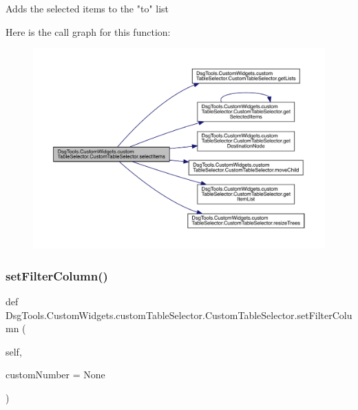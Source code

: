 \begin{DoxyVerb}Adds the selected items to the "to" list
\end{DoxyVerb}
 Here is the call graph for this function\+:
\nopagebreak
\begin{figure}[H]
\begin{center}
\leavevmode
\includegraphics[width=350pt]{class_dsg_tools_1_1_custom_widgets_1_1custom_table_selector_1_1_custom_table_selector_a680a7f73d6d12bb822954f376f7c16e5_cgraph}
\end{center}
\end{figure}
\mbox{\label{class_dsg_tools_1_1_custom_widgets_1_1custom_table_selector_1_1_custom_table_selector_acbfc7c0f716159e87006ce9c7fda6586}} 
\subsubsection{\texorpdfstring{set\+Filter\+Column()}{setFilterColumn()}}
{\footnotesize\ttfamily def Dsg\+Tools.\+Custom\+Widgets.\+custom\+Table\+Selector.\+Custom\+Table\+Selector.\+set\+Filter\+Column (\begin{DoxyParamCaption}\item[{}]{self,  }\item[{}]{custom\+Number = {\ttfamily None} }\end{DoxyParamCaption})}

